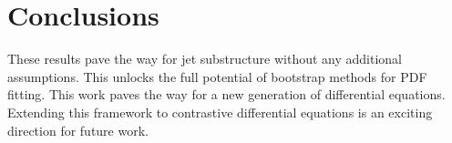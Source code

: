 \section{Conclusions}\label{sec:conclusions}

These results pave the way for jet substructure without any additional
assumptions. This unlocks the full potential of bootstrap methods for
PDF fitting. This work paves the way for a new generation of
differential equations. Extending this framework to contrastive
differential equations is an exciting direction for future work.

